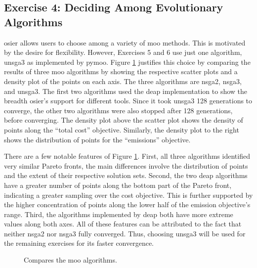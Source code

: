 \subsection{Exercise 4: Deciding Among Evolutionary Algorithms}

\ac{osier} allows users to choose among a variety of \ac{moo} methods. This is
motivated by the desire for flexibility. However, Exercises 5 and 6 use just one
algorithm, \ac{unsga3} as implemented by \ac{pymoo}. Figure
\ref{fig:algorithm-comparison} justifies this choice by comparing the results of
three \ac{moo} algorithms by showing the respective scatter plots and a density
plot of the points on each axis. The three algorithms are \ac{nsga2},
\ac{nsga3}, and \ac{unsga3}. The first two algorithms used the \ac{deap}
implementation to show the breadth \ac{osier}'s support for different tools.
Since it took \ac{unsga3} 128 generations to converge, the other two algorithms
were also stopped after 128 generations, before converging. The density plot
above the scatter plot shows the density of points along the ``total cost''
objective. Similarly, the density plot to the right shows the distribution of
points for the ``emissions'' objective.

There are a few notable features of Figure \ref{fig:algorithm-comparison}.
First, all three algorithms identified very similar Pareto fronts, the main
differences involve the distribution of points and the extent of their
respective solution sets. Second, the two \ac{deap} algorithms have a greater
number of points along the bottom part of the Pareto front, indicating a greater
sampling over the cost objective. This is further supported by the higher
concentration of points along the lower half of the emission objective's range.
Third, the algorithms implemented by \ac{deap} both have more extreme values
along both axes. All of these features can be attributed to the fact that
neither \ac{nsga2} nor \ac{nsga3} fully converged. Thus, choosing \ac{unsga3}
will be used for the remaining exercises for its faster convergence.

\begin{figure}[ht]
  \centering
  \resizebox{0.75\columnwidth}{!}{}
  \caption{Compares the \ac{moo} algorithms.}
  \label{fig:algorithm-comparison}
\end{figure}

\FloatBarrier
